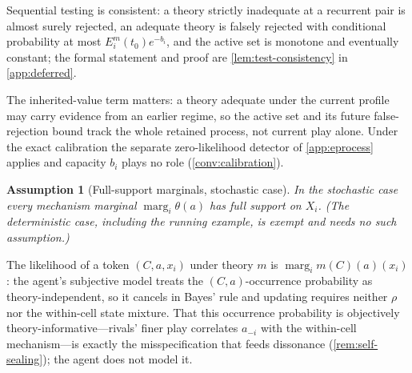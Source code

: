 \documentclass[11pt]{article}
\newtheorem{assumption}{Assumption}[section]
\theoremstyle{definition}
\newcommand{\marg}[1]{\operatorname{marg}_{#1}}
\begin{document}
Sequential testing is consistent: a theory strictly inadequate at a recurrent pair is almost surely rejected, an adequate theory is falsely rejected with conditional probability at most $E_i^m(t_0)e^{-b_i}$, and the active set is monotone and eventually constant; the formal statement and proof are \cref{lem:test-consistency} in \cref{app:deferred}.

The inherited-value term matters: a theory adequate under the current profile may carry evidence from an earlier regime, so the active set and its future false-rejection bound track the whole retained process, not current play alone.
Under the exact calibration the separate zero-likelihood detector of \cref{app:eprocess} applies and capacity $b_i$ plays no role (\cref{conv:calibration}).

\begin{assumption}[Full-support marginals, stochastic case]
\label{ass:full-support}
In the stochastic case every mechanism marginal $\marg{i}\theta(a)$ has full support on $X_i$.
(The deterministic case, including the running example, is exempt and needs no such assumption.)
\end{assumption}

The likelihood of a token $(C,a,x_i)$ under theory $m$ is $\marg{i}m(C)(a)(x_i)$: the agent's subjective model treats the $(C,a)$-occurrence probability as theory-independent, so it cancels in Bayes' rule and updating requires neither $\rho$ nor the within-cell state mixture.
That this occurrence probability is objectively theory-informative---rivals' finer play correlates $a_{-i}$ with the within-cell mechanism---is exactly the misspecification that feeds dissonance (\cref{rem:self-sealing}); the agent does not model it.
\end{document}
